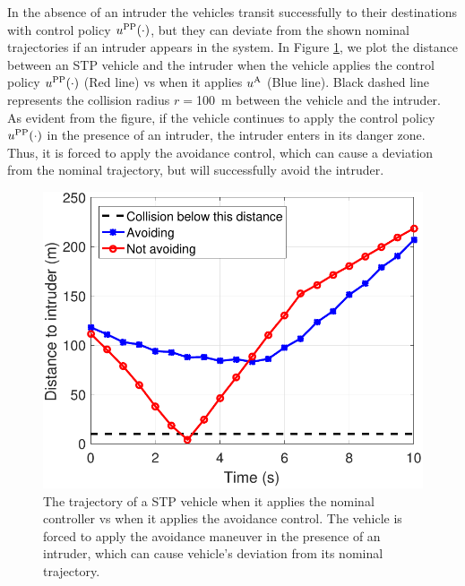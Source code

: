 In the absence of an intruder the vehicles transit successfully to their destinations with control policy $u^{\text{PP}}(\cdot)$, but they can deviate from the shown nominal trajectories if an intruder appears in the system. In Figure \ref{fig:trajComparison}, we plot the distance between an STP vehicle and the intruder when the vehicle applies the control policy $u^{\text{PP}}(\cdot)$ (Red line) vs when it applies ${u^{\text{A}}}$ (Blue line). Black dashed line represents the collision radius $r=$\SI{100}{\m} between the vehicle and the intruder. As evident from the figure, if the vehicle continues to apply the control policy $u^{\text{PP}}(\cdot)$ in the presence of an intruder, the intruder enters in its danger zone. Thus, it is forced to apply the avoidance control, which can cause a deviation from the nominal trajectory, but will successfully avoid the intruder.
\begin{figure}[H]
  \centering
  \includegraphics[width=0.7\columnwidth]{"figs/simulateIntruder"}
  \caption{The trajectory of a STP vehicle when it applies the nominal controller vs when it applies the avoidance control. The vehicle is forced to apply the avoidance maneuver in the presence of an intruder, which can cause vehicle's deviation from its nominal trajectory.}
  \label{fig:trajComparison}
\end{figure}

